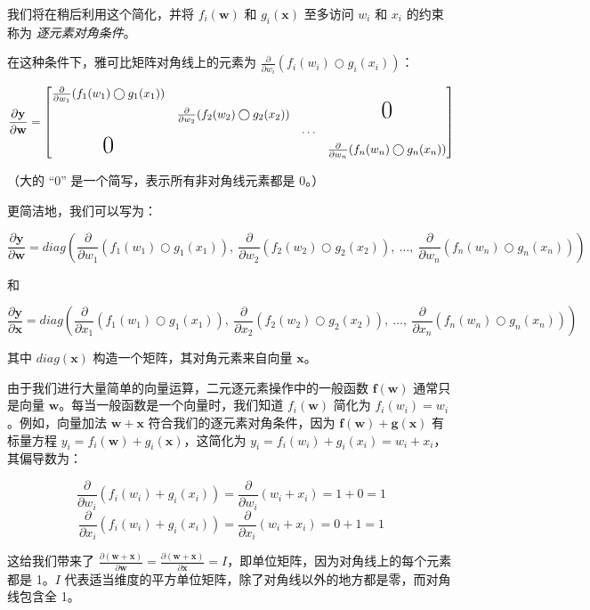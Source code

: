 \documentclass[lang=cn,newtx,10pt,scheme=chinese]{elegantbook}
\begin{document}
我们将在稍后利用这个简化，并将 $f_i(\mathbf{w})$ 和 $g_i(\mathbf{x})$ 至多访问 $w_i$ 和 $x_i$ 的约束称为 {\em 逐元素对角条件}。

在这种条件下，雅可比矩阵对角线上的元素为 $\frac{\partial}{\partial w_i} ( f_i(w_i) \bigcirc g_i(x_i) )$：

\[\frac{\partial \mathbf{y}}{\partial \mathbf{w}}  = \begin{bmatrix}
\frac{\partial}{\partial w_1} ( f_{1}(w_1) \bigcirc g_{1}(x_1) )\\
& \frac{\partial}{\partial w_2} (f_{2}(w_2) \bigcirc g_{2}(x_2) ) & & \text{\huge0}\\
& & \ldots \\
\text{\huge0}& & & \frac{\partial}{\partial w_n} (f_{n}(w_n) \bigcirc g_{n}(x_n) )
\end{bmatrix}\]

（大的 ``0'' 是一个简写，表示所有非对角线元素都是 0。）

更简洁地，我们可以写为：

\[\frac{\partial \mathbf{y}}{\partial \mathbf{w}} = diag \left( \frac{\partial}{\partial w_1}(f_{1}(w_1) \bigcirc g_{1}(x_1)),~ \frac{\partial}{\partial w_2}(f_{2}(w_2) \bigcirc g_{2}(x_2)),~ \ldots,~ \frac{\partial}{\partial w_n}(f_{n}(w_n) \bigcirc g_{n}(x_n)) \right)\]

和

\[\frac{\partial \mathbf{y}}{\partial \mathbf{x}} = diag \left( \frac{\partial}{\partial x_1}(f_{1}(w_1) \bigcirc g_{1}(x_1)),~ \frac{\partial}{\partial x_2}(f_{2}(w_2) \bigcirc g_{2}(x_2)),~ \ldots,~ \frac{\partial}{\partial x_n}(f_{n}(w_n) \bigcirc g_{n}(x_n)) \right)\]

其中 $diag(\mathbf{x})$ 构造一个矩阵，其对角元素来自向量 $\mathbf{x}$。

由于我们进行大量简单的向量运算，二元逐元素操作中的一般函数 $\mathbf{f(w)}$ 通常只是向量 $\mathbf{w}$。每当一般函数是一个向量时，我们知道 $f_i(\mathbf{w})$ 简化为 $f_i(w_i) = w_i$。例如，向量加法 $\mathbf{w + x}$ 符合我们的逐元素对角条件，因为 $\mathbf{f(w)} + \mathbf{g(x)}$ 有标量方程 $y_i = f_i(\mathbf{w}) + g_i(\mathbf{x})$，这简化为 $y_i = f_i(w_i) + g_i(x_i) = w_i + x_i$，其偏导数为：

\[\frac{\partial}{\partial w_i} ( f_{i}(w_i) + g_{i}(x_i) ) = \frac{\partial}{\partial w_i}(w_i + x_i) = 1 + 0 = 1\]\[\frac{\partial}{\partial x_i} ( f_{i}(w_i) + g_{i}(x_i) ) = \frac{\partial}{\partial x_i}(w_i + x_i) = 0 + 1 = 1\]

这给我们带来了 $\frac{\partial (\mathbf{w+x})}{\partial \mathbf{w}} = \frac{\partial (\mathbf{w+x})}{\partial \mathbf{x}} = I$，即单位矩阵，因为对角线上的每个元素都是 1。$I$ 代表适当维度的平方单位矩阵，除了对角线以外的地方都是零，而对角线包含全 1。
\end{document}
